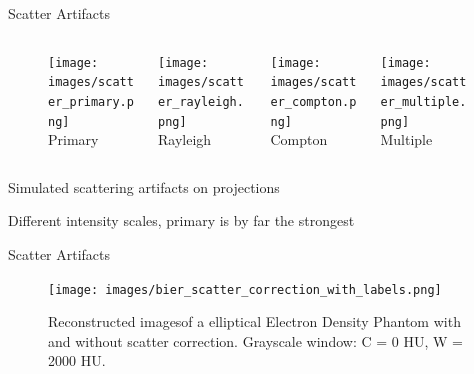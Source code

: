 \begin{frame}[c]{Scatter Artifacts}
	\begin{figure}[]
		\centering
		\begin{columns}[t, onlytextwidth]
			\begin{column}{0.25\textwidth}
				\centering{}
				\texttt{[image: images/scatter\_primary.png]}\\
				Primary
			\end{column}\begin{column}{0.25\textwidth}
				\centering{}
				\texttt{[image: images/scatter\_rayleigh.png]}\\
				Rayleigh
			\end{column}\begin{column}{0.25\textwidth}
				\centering{}
				\texttt{[image: images/scatter\_compton.png]}\\
				Compton
			\end{column}\begin{column}{0.25\textwidth}
				\centering{}
				\texttt{[image: images/scatter\_multiple.png]}\\
				Multiple
			\end{column}
		\end{columns}
	\end{figure}
	\flushright{}
	\small Simulated scattering artifacts on projections

	Different intensity scales, primary is by far the strongest
\end{frame}




\begin{frame}[c]{Scatter Artifacts}
	\begin{figure}[htpb]
		\centering
		\texttt{[image: images/bier\_scatter\_correction\_with\_labels.png]}
		\caption{Reconstructed imagesof a elliptical Electron Density Phantom with and without scatter correction. Grayscale window: C = 0 HU, W = 2000 HU.}%
	\end{figure}

	\vspace{0.5cm}
	\flushright{}
	\tiny

\end{frame}



